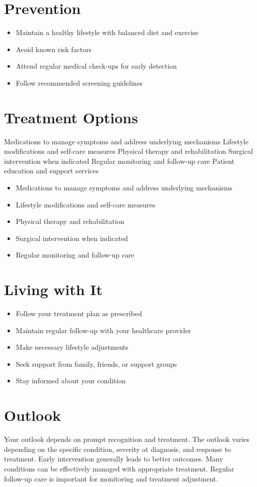 \section{Prevention}
\begin{itemize}[noitemsep]
  \item Maintain a healthy lifestyle with balanced diet and exercise
  \item Avoid known risk factors
  \item Attend regular medical check-ups for early detection
  \item Follow recommended screening guidelines
\end{itemize}
\section{Treatment Options}
Medications to manage symptoms and address underlying mechanisms Lifestyle modifications and self-care measures Physical therapy and rehabilitation Surgical intervention when indicated Regular monitoring and follow-up care Patient education and support services

\begin{itemize}[noitemsep]
  \item Medications to manage symptoms and address underlying mechanisms
  \item Lifestyle modifications and self-care measures
  \item Physical therapy and rehabilitation
  \item Surgical intervention when indicated
  \item Regular monitoring and follow-up care
\end{itemize}
\section{Living with It}
\begin{itemize}[noitemsep]
  \item Follow your treatment plan as prescribed
  \item Maintain regular follow-up with your healthcare provider
  \item Make necessary lifestyle adjustments
  \item Seek support from family, friends, or support groups
  \item Stay informed about your condition
\end{itemize}
\section{Outlook}
Your outlook depends on prompt recognition and treatment. The outlook varies depending on the specific condition, severity at diagnosis, and response to treatment. Early intervention generally leads to better outcomes. Many conditions can be effectively managed with appropriate treatment. Regular follow-up care is important for monitoring and treatment adjustment.
